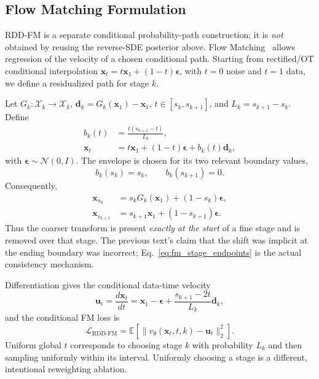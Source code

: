 \documentclass[10pt]{article}
\newcommand{\E}{\mathbb{E}}
\newcommand{\N}{\mathcal{N}}
\newcommand{\bx}{\bm{x}}
\newcommand{\beps}{\bm{\epsilon}}
\newcommand{\bd}{\bm{d}}
\newcommand{\bu}{\bm{u}}
\begin{document}
\subsection{Flow Matching Formulation}
\label{sec:fm}

RDD-FM is a separate conditional probability-path construction; it is \emph{not} obtained by reusing the reverse-SDE posterior above. Flow Matching~\citep{lipman2023fm} allows regression of the velocity of a chosen conditional path. Starting from rectified/OT conditional interpolation $\bx_t=t\bx_1+(1-t)\beps$, with $t=0$ noise and $t=1$ data, we define a residualized path for stage $k$.

Let $G_k:\mathcal X_k\to\mathcal X_k$, $\bd_k=G_k(\bx_1)-\bx_1$, $t\in[s_k,s_{k+1}]$, and $L_k=s_{k+1}-s_k$. Define
\begin{align}
    b_k(t) &= \frac{t(s_{k+1}-t)}{L_k}, \\
    \bx_t &= t\bx_1+(1-t)\beps+b_k(t)\bd_k,
    \label{eq:fm_interpolant}
\end{align}
with $\beps\sim\N(0,I)$. The envelope is chosen for its two relevant boundary values,
\begin{equation}
    b_k(s_k)=s_k,\qquad b_k(s_{k+1})=0.
    \label{eq:fm_envelope_boundaries}
\end{equation}
Consequently,
\begin{align}
    \bx_{s_k} &= s_k G_k(\bx_1)+(1-s_k)\beps, \\
    \bx_{s_{k+1}} &= s_{k+1}\bx_1+(1-s_{k+1})\beps.
    \label{eq:fm_stage_endpoints}
\end{align}
Thus the coarser transform is present \emph{exactly at the start} of a fine stage and is removed over that stage. The previous text's claim that the shift was implicit at the ending boundary was incorrect; Eq.~\eqref{eq:fm_stage_endpoints} is the actual consistency mechanism.

Differentiation gives the conditional data-time velocity
\begin{equation}
    \bu_t=\frac{d\bx_t}{dt}=\bx_1-\beps+\frac{s_{k+1}-2t}{L_k}\bd_k,
    \label{eq:fm_velocity}
\end{equation}
and the conditional FM loss is
\begin{equation}
    \mathcal L_{\mathrm{RDD\text{-}FM}}
    =\E\!\left[\|v_\theta(\bx_t,t,k)-\bu_t\|_2^2\right].
    \label{eq:fm_loss}
\end{equation}
Uniform global $t$ corresponds to choosing stage $k$ with probability $L_k$ and then sampling uniformly within its interval. Uniformly choosing a stage is a different, intentional reweighting ablation.
\end{document}
